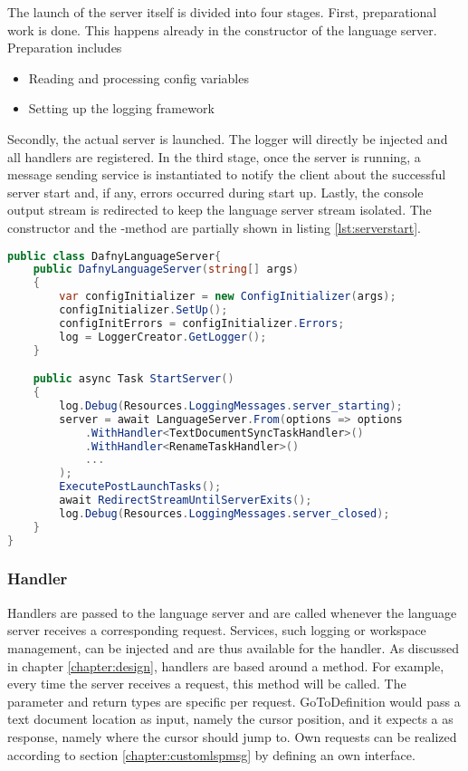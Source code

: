 The launch of the server itself is divided into four stages.
First, preparational work is done.
This happens already in the constructor of the language server.
Preparation includes
\begin{itemize}
    \item Reading and processing config variables
    \item Setting up the logging framework
\end{itemize}
Secondly, the actual server is launched.
The logger will directly be injected and all handlers are registered.
In the third stage, once the server is running, a message sending service is instantiated to notify the client about the successful server start and, if any, errors occurred during start up.
Lastly, the console output stream is redirected to keep the language server stream isolated.
The constructor and the -method are partially shown in listing \ref{lst:serverstart}.

\begin{lstlisting}[language=csharp, caption={Starting the Language Server}, captionpos=b, label={lst:serverstart}]
public class DafnyLanguageServer{
    public DafnyLanguageServer(string[] args)
    {
        var configInitializer = new ConfigInitializer(args);
        configInitializer.SetUp();
        configInitErrors = configInitializer.Errors;
        log = LoggerCreator.GetLogger();
    }

    public async Task StartServer()
    {
        log.Debug(Resources.LoggingMessages.server_starting);
        server = await LanguageServer.From(options => options
            .WithHandler<TextDocumentSyncTaskHandler>()
            .WithHandler<RenameTaskHandler>()
            ...
        );
        ExecutePostLaunchTasks();
        await RedirectStreamUntilServerExits();
        log.Debug(Resources.LoggingMessages.server_closed);
    }
}
\end{lstlisting}

\subsubsection{Handler}
Handlers are passed to the language server and are called whenever the language server receives a corresponding request.
Services, such logging or workspace management, can be injected and are thus available for the handler.
As discussed in chapter \ref{chapter:design}, handlers are based around a  method.
For example, every time the server receives a  request, this  method will be called.
The parameter and return types are specific per request.
GoToDefinition would pass a text document location as input, namely the cursor position, and it expects a  as response,
namely where the cursor should jump to.
Own requests can be realized according to section \ref{chapter:customlspmsg} by defining an own interface.\\

